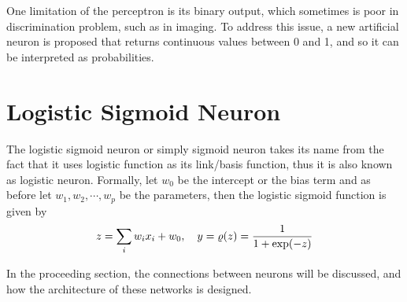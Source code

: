One limitation of the perceptron is its binary output, which sometimes is poor in discrimination problem, such as in imaging. To address this issue, a new artificial neuron is proposed that returns continuous values between 0 and 1, and so it can be interpreted as probabilities.

\section{Logistic Sigmoid Neuron}\label{sec:sln}
The logistic sigmoid neuron or simply sigmoid neuron takes its name from the fact that it uses logistic function as its link/basis function, thus it is also known as logistic neuron. Formally, let $w_0$ be the intercept or the bias term and as before let $w_1,w_2,\cdots,w_p$ be the parameters, then the logistic sigmoid function is given by
\begin{equation}\label{eq:logsig}
z=\sum_{i}w_ix_i+w_0,\quad y=\varrho(z)=\frac{1}{1+\exp(-z)}
\end{equation}

In the proceeding section, the connections between neurons will be discussed, and how the architecture of these networks is designed.

